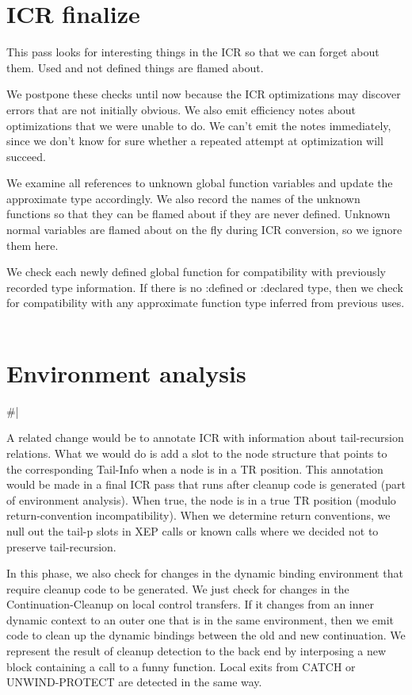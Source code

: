\chapter{ICR finalize} %

This pass looks for interesting things in the ICR so that we can forget about
them.  Used and not defined things are flamed about.

We postpone these checks until now because the ICR optimizations may discover
errors that are not initially obvious.  We also emit efficiency notes about
optimizations that we were unable to do.  We can't emit the notes immediately,
since we don't know for sure whether a repeated attempt at optimization will
succeed.

We examine all references to unknown global function variables and update the
approximate type accordingly.  We also record the names of the unknown
functions so that they can be flamed about if they are never defined.  Unknown
normal variables are flamed about on the fly during ICR conversion, so we
ignore them here.

We check each newly defined global function for compatibility with previously
recorded type information.  If there is no :defined or :declared type, then we
check for compatibility with any approximate function type inferred from
previous uses.
	
\chapter{Environment analysis}
\#|

A related change would be to annotate ICR with information about tail-recursion
relations.  What we would do is add a slot to the node structure that points to
the corresponding Tail-Info when a node is in a TR position.  This annotation
would be made in a final ICR pass that runs after cleanup code is generated
(part of environment analysis).  When true, the node is in a true TR position
(modulo return-convention incompatibility).  When we determine return
conventions, we null out the tail-p slots in XEP calls or known calls where we
decided not to preserve tail-recursion. 


In this phase, we also check for changes in the dynamic binding environment
that require cleanup code to be generated.  We just check for changes in the
Continuation-Cleanup on local control transfers.  If it changes from
an inner dynamic context to an outer one that is in the same environment, then
we emit code to clean up the dynamic bindings between the old and new
continuation.  We represent the result of cleanup detection to the back end by
interposing a new block containing a call to a funny function.  Local exits
from CATCH or UNWIND-PROTECT are detected in the same way.


